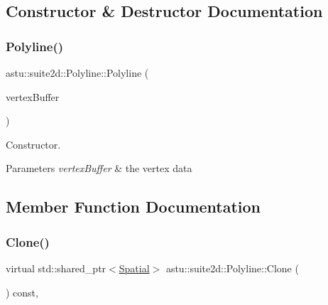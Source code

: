 \subsection{Constructor \& Destructor Documentation}
\mbox{\label{classastu_1_1suite2d_1_1Polyline_a051bca4fde4c41e93462d229b17fa370}} 
\subsubsection{\texorpdfstring{Polyline()}{Polyline()}}
{\footnotesize\ttfamily astu\+::suite2d\+::\+Polyline\+::\+Polyline (\begin{DoxyParamCaption}\item[{std\+::shared\+\_\+ptr$<$ \hyperlink{group__gfx__group_ga081cf45a441eef100dfbb1e0f64c3826}{Vertex\+Buffer2f} $>$}]{vertex\+Buffer }\end{DoxyParamCaption})}

Constructor.


\begin{DoxyParams}{Parameters}
{\em vertex\+Buffer} & the vertex data \\
\hline
\end{DoxyParams}


\subsection{Member Function Documentation}
\mbox{\label{classastu_1_1suite2d_1_1Polyline_acdced9a02e4f789ff04feca46bdb297c}} 
\subsubsection{\texorpdfstring{Clone()}{Clone()}}
{\footnotesize\ttfamily virtual std\+::shared\+\_\+ptr$<$\hyperlink{classastu_1_1suite2d_1_1Spatial}{Spatial}$>$ astu\+::suite2d\+::\+Polyline\+::\+Clone (\begin{DoxyParamCaption}{ }\end{DoxyParamCaption}) const\hspace{0.3cm}{\ttfamily [override]}, {\ttfamily [virtual]}}

